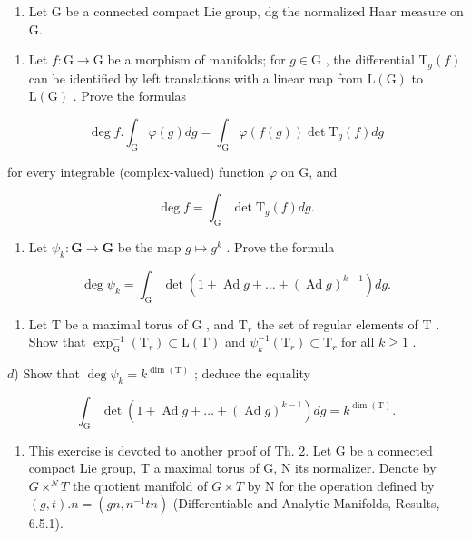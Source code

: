 \begin{enumerate}
\def\labelenumi{\arabic{enumi})}
\setcounter{enumi}{7}
\tightlist
\item
  Let G be a connected compact Lie group, dg the normalized Haar measure on G.
\end{enumerate}

\begin{enumerate}
\def\labelenumi{\alph{enumi})}
\tightlist
\item
  Let \(f: \mathrm{G} \to \mathrm{G}\) be a morphism of manifolds; for \(g \in \mathrm{G}\) , the differential \(\mathrm{T}_g(f)\) can be identified by left translations with a linear map from \(\mathrm{L}(\mathrm{G})\) to \(\mathrm{L}(\mathrm{G})\) . Prove the formulas
\end{enumerate}

\[
\deg f. \int_ {\mathrm{G}} \varphi (g) d g = \int_ {\mathrm{G}} \varphi (f (g)) \det \mathrm{T} _ {g} (f) d g
\]

for every integrable (complex-valued) function \(\varphi\) on G, and

\[
\deg f = \int_ {\mathrm{G}} \det \mathrm{T} _ {g} (f) d g.
\]

\begin{enumerate}
\def\labelenumi{\alph{enumi})}
\setcounter{enumi}{1}
\tightlist
\item
  Let \(\psi_k: \mathbf{G} \to \mathbf{G}\) be the map \(g \mapsto g^k\) . Prove the formula
\end{enumerate}

\[
\deg \psi_ {k} = \int_ {\mathrm{G}} \det (1 + \operatorname{Ad} g + \dots + (\operatorname{Ad} g) ^ {k - 1}) d g.
\]

\begin{enumerate}
\def\labelenumi{\alph{enumi})}
\setcounter{enumi}{2}
\tightlist
\item
  Let \(\mathrm{T}\) be a maximal torus of \(\mathrm{G}\) , and \(\mathrm{T}_r\) the set of regular elements of \(\mathrm{T}\) . Show that \(\exp_{\mathrm{G}}^{-1}(\mathrm{T}_r) \subset \mathrm{L}(\mathrm{T})\) and \(\psi_k^{-1}(\mathrm{T}_r) \subset \mathrm{T}_r\) for all \(k \geq 1\) .
\end{enumerate}

\(d\)) Show that \(\deg \psi_{k} = k^{\dim (\mathrm{T})}\) ; deduce the equality

\[
\int_ {\mathrm{G}} \det (1 + \operatorname{Ad} g + \dots + (\operatorname{Ad} g) ^ {k - 1}) d g = k ^ {\dim (\mathrm{T})}.
\]

\begin{enumerate}
\def\labelenumi{\arabic{enumi})}
\setcounter{enumi}{8}
\tightlist
\item
  This exercise is devoted to another proof of Th. 2. Let G be a connected compact Lie group, T a maximal torus of G, N its normalizer. Denote by \(G \times^{N} T\) the quotient manifold of \(G \times T\) by N for the operation defined by \((g, t).n = (gn, n^{-1}tn)\) (Differentiable and Analytic Manifolds, Results, 6.5.1).
\end{enumerate}

